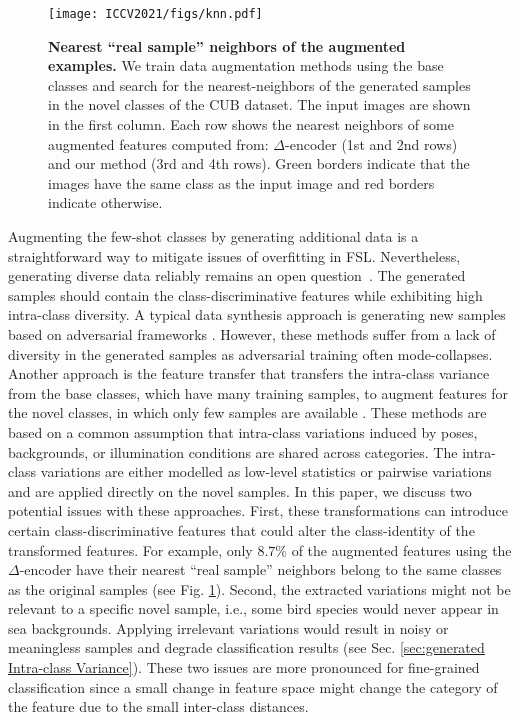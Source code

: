 \documentclass[10pt,twocolumn,letterpaper]{article}
\begin{document}
\begin{figure}
 \texttt{[image: ICCV2021/figs/knn.pdf]}
    \centering
\caption{\textbf{Nearest ``real sample'' neighbors of the augmented examples.} We train data augmentation methods using the base classes and search for the nearest-neighbors of the generated samples in the novel classes of the CUB dataset. The input images are shown in the first column. Each row shows the nearest neighbors of some augmented features computed from: $\Delta$-encoder \cite{delta-encoder} (1st and 2nd rows) and our method (3rd and 4th rows). Green borders indicate that the images have the same class as the input image and red borders indicate otherwise. }
 
    \label{fig:teaser}
\end{figure}


Augmenting the few-shot classes by generating additional data is a straightforward way to mitigate issues of overfitting in FSL. Nevertheless, generating diverse data reliably remains an open question~\cite{Le-etal-ICCV19,appleShrivastavaPTSW16}. 
The generated samples should contain the class-discriminative features while exhibiting high intra-class diversity.
A typical data synthesis approach is generating new samples based on adversarial frameworks \cite{metair_gan, adversarial2020kai, gao2018adversarial, metagan, dagan,Le_2020_ECCV,le2020physicsbased,m_Le-etal-ECCV18}. However, these methods suffer from a lack of diversity in the generated samples as adversarial training often mode-collapses. Another approach is the feature transfer that transfers the intra-class variance from the base classes, which have many training samples, to augment features for the novel classes, in which only few samples are available \cite{delta-encoder, feature_transfer, hallucinate_features}. These methods are based on a common assumption that intra-class variations induced by poses, backgrounds, or illumination conditions are shared across categories.
The intra-class variations are either modelled as low-level statistics \cite{feature_transfer} or pairwise variations \cite{delta-encoder,hallucinate_features} and are applied directly on the novel samples. 
In this paper, we discuss two potential issues with these approaches. First, these transformations can introduce certain class-discriminative features that could alter the class-identity of the transformed features. For example, only $8.7\%$ of the augmented features using the $\Delta$-encoder\cite{delta-encoder} have their nearest ``real sample'' neighbors belong to the same classes as the original samples (see Fig. \ref{fig:teaser}). Second, 
the extracted variations might not be relevant to a specific novel sample, i.e., some bird species would never appear in sea backgrounds. Applying irrelevant variations would result in noisy or meaningless samples and degrade  classification results (see Sec. \ref{sec:generated Intra-class Variance}). These two issues are more pronounced for fine-grained classification since a small change in feature space might change the category of the feature due to the small inter-class distances. 
\end{document}
